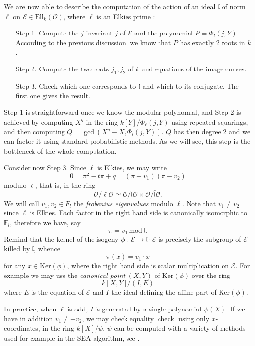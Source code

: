 \documentclass[12pt]{article}
\newcommand{\F}{\mathbb{F}}
\renewcommand{\frak}{\mathfrak}
\newcommand{\E}{\mathcal{E}}
\renewcommand{\O}{\mathcal{O}}
\newcommand{\Ell}{\mathrm{Ell}}
\newcommand{\Ker}{\mathrm{Ker}}
\renewcommand{\mod}{\mathrm{mod}}
\begin{document}
We are now able to describe the computation of the action of an ideal $\frak l$ of norm $\ell$ on $\E \in \Ell_k(\O)$, where $\ell$ is an Elkies prime :
\begin{enumerate}
\item[Step 1.] Compute the $j$-invariant $j$ of $\E$ and the polynomial $P = \Phi_l(j, Y)$. According to the previous discussion, we know that $P$ has exactly 2 roots in $k$.
\item[Step 2.] Compute the two roots $j_1, j_2$ of $k$ and equations of the image curves.
\item[Step 3.] Check which one corresponds to $\frak l$ and which to its conjugate. The first one gives the result.
\end{enumerate}

Step 1 is straightforward once we know the modular polynomial, and Step 2 is achieved by computing $X^q$ in the ring $k[Y]/\Phi_\ell(j, Y)$ using repeated squarings, and then computing $Q = \gcd(X^q - X, \Phi_l(j, Y))$. $Q$ has then degree 2 and we can factor it using standard probabilistic methods. As we will see, this step is the bottleneck of the whole computation.

Consider now Step 3. Since $\ell$ is Elkies, we may write
$$ 0 = \pi^2 - t\pi + q = (\pi - v_1)(\pi - v_2)$$
modulo $\ell$, that is, in the ring
$$\O/\ell\O \simeq \O/\frak l \O \times \O/ \bar{\frak l}\O.$$
We will call $v_1, v_2\in F_l$ the \emph{frobenius eigenvalues} modulo $\ell$. Note that $v_1\neq v_2$ since $\ell$ is Elkies. Each factor in the right hand side is canonically isomorphic to $\F_l$, therefore we have, say
$$\pi = v_1 \ \mod\ \frak l.$$
Remind that the kernel of the isogeny $\phi\ :\ \E\to \frak l\cdot \E$ is precisely the subgroup of $\E$ killed by $\frak l$, whence
\begin{equation}\label{check}
\pi(x) = v_1\cdot x
\end{equation}
for any $x\in \Ker(\phi)$, where the right hand side is scalar multiplication on $\E$. For example we may use the \emph{canonical point} $(X, Y)$ of $\Ker(\phi)$ over the ring
$$k[X, Y] / (I, E)$$
where $E$ is the equation of $\E$ and $I$ the ideal defining the affine part of $\Ker(\phi)$.

In practice, when $\ell$ is odd, $I$ is generated by a single polynomial $\psi(X)$. If we have in addition $v_1\neq -v_2$, we may check equality \ref{check} using only $x$-coordinates, in the ring $k[X]/\psi.$ $\psi$ can be computed with a variety of methods used for example in the SEA algorithm, see \cite{BMSS}.
\end{document}
